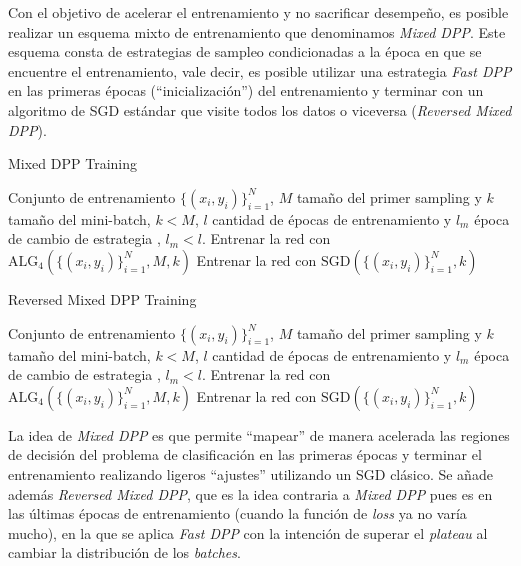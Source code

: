 \vspace{0.2cm}

Con el objetivo de acelerar el entrenamiento y no sacrificar desempeño, es posible realizar un esquema mixto de entrenamiento que denominamos \textit{Mixed DPP}. Este esquema consta de estrategias de sampleo condicionadas a la época en que se encuentre el entrenamiento, vale decir, es posible utilizar una estrategia \textit{Fast DPP} en las primeras épocas (``inicialización'') del entrenamiento y terminar con un algoritmo de SGD estándar que visite todos los datos o viceversa (\textit{Reversed Mixed DPP}). 

\begin{algorithm}[ht]
\caption{Mixed DPP Training}\label{alg:alg5}
\begin{algorithmic}
\Require Conjunto de entrenamiento $\{(x_i,y_i) \}_{i=1}^N$, $M$ tamaño del primer sampling y $k$ tamaño del mini-batch, $k < M$, $l$ cantidad de épocas de entrenamiento y $l_m$ época de cambio de estrategia , $l_m < l$. 
\State Entrenar la red con $\text{ALG}_4(\{(x_i,y_i)\}_{i=1}^N , M, k)$
\Else
\State Entrenar la red con $\text{SGD}(\{(x_i,y_i) \}_{i=1}^N,k)$
\EndIf
\EndFor
\end{algorithmic}
\end{algorithm}

\begin{algorithm}[ht]
\caption{Reversed Mixed DPP Training}\label{alg:alg6}
\begin{algorithmic}
\Require Conjunto de entrenamiento $\{(x_i,y_i) \}_{i=1}^N$, $M$ tamaño del primer sampling y $k$ tamaño del mini-batch, $k < M$, $l$ cantidad de épocas de entrenamiento y $l_m$ época de cambio de estrategia , $l_m < l$. 
\State Entrenar la red con $\text{ALG}_4(\{(x_i,y_i)\}_{i=1}^N , M, k)$
\Else
\State Entrenar la red con $\text{SGD}(\{(x_i,y_i) \}_{i=1}^N,k)$
\EndIf
\EndFor
\end{algorithmic}
\end{algorithm}

\vspace{0.2cm}

La idea de \textit{Mixed DPP} es que permite ``mapear'' de manera acelerada las regiones de decisión del problema de clasificación en las primeras épocas y terminar el entrenamiento realizando ligeros ``ajustes'' utilizando un SGD clásico. Se añade además \textit{Reversed Mixed DPP}, que es la idea contraria a \textit{Mixed DPP} pues es en las últimas épocas de entrenamiento (cuando la función de \textit{loss} ya no varía mucho), en la que se aplica \textit{Fast DPP} con la intención de superar el \textit{plateau} al cambiar la distribución de los \textit{batches}. 

